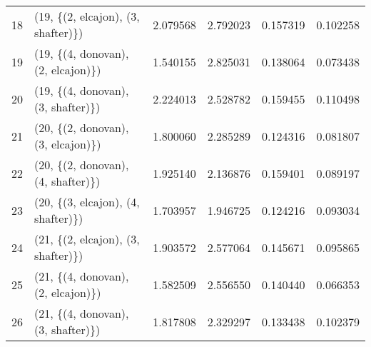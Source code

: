 \begin{tabular}{llrrrr}
18 &  (19, \{(2, elcajon), (3, shafter)\}) &  2.079568 &  2.792023 &   0.157319 &  0.102258 \\
19 &  (19, \{(4, donovan), (2, elcajon)\}) &  1.540155 &  2.825031 &   0.138064 &  0.073438 \\
20 &  (19, \{(4, donovan), (3, shafter)\}) &  2.224013 &  2.528782 &   0.159455 &  0.110498 \\
21 &  (20, \{(2, donovan), (3, elcajon)\}) &  1.800060 &  2.285289 &   0.124316 &  0.081807 \\
22 &  (20, \{(2, donovan), (4, shafter)\}) &  1.925140 &  2.136876 &   0.159401 &  0.089197 \\
23 &  (20, \{(3, elcajon), (4, shafter)\}) &  1.703957 &  1.946725 &   0.124216 &  0.093034 \\
24 &  (21, \{(2, elcajon), (3, shafter)\}) &  1.903572 &  2.577064 &   0.145671 &  0.095865 \\
25 &  (21, \{(4, donovan), (2, elcajon)\}) &  1.582509 &  2.556550 &   0.140440 &  0.066353 \\
26 &  (21, \{(4, donovan), (3, shafter)\}) &  1.817808 &  2.329297 &   0.133438 &  0.102379 \\
\bottomrule
\end{tabular}
